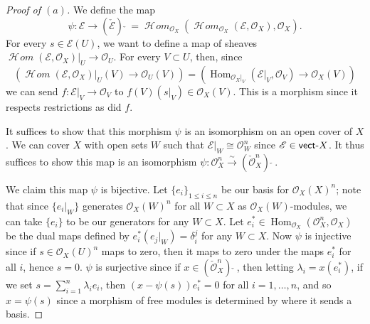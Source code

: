 \documentclass[10pt]{article}
\theoremstyle{definition}
\theoremstyle{remark}
\numberwithin{equation}{section}
\numberwithin{figure}{subsubsection}
\DeclareMathOperator{\Hom}{Hom}
\newcommand{\EE}{\mathscr{E}}
\newcommand{\OO}{\mathcal{O}}
\DeclareMathOperator{\HHom}{\mathscr{H}\!\mathit{om}}
\newcommand{\isoto}{\overset{\sim}{\to}}
\newcommand{\vect}{\mathsf{vect}\mathchar`-}
\begin{document}
\begin{proof}[Proof of $(a)$]
  We define the map
  \begin{equation*}
    \psi\colon\EE \to (\check{\EE})\:\check{}\: = \HHom_{\OO_X}(\HHom_{\OO_X}(\EE,\OO_X),\OO_X).
  \end{equation*}
  For every $s \in \EE(U)$, we want to define a map of sheaves $\HHom(\EE,\OO_X)\vert_U \to \OO_U$. For every $V \subset U$, then, since
  \begin{equation*}
    \left(\HHom(\EE,\OO_X)\vert_U(V) \to \OO_U(V) \right) = \left( \Hom_{\OO_X\vert_V}(\EE\vert_V,\OO_V) \to \OO_X(V) \right)
  \end{equation*}
  we can send $f \colon \EE\vert_V\to\OO_V$ to $f(V)(s\vert_V) \in \OO_X(V)$. This is a morphism since it respects restrictions as did $f$.
  \par It suffices to show that this morphism $\psi$ is an isomorphism on an open cover of $X$. We can cover $X$ with open sets $W$ such that $\EE\vert_W \cong \OO_W^n$ since $\EE \in \vect X$. It thus suffices to show this map is an isomorphism $\psi\colon\OO_X^n \isoto (\check{\OO}_X^n)\:\check{}\:$.
  \par We claim this map $\psi$ is bijective. Let $\{e_i\}_{1 \le i \le n}$ be our basis for $\OO_X(X)^n$; note that since $\{e_i\vert_W\}$ generates $\OO_X(W)^n$ for all $W \subset X$ as $\OO_X(W)$-modules, we can take $\{e_i\}$ to be our generators for any $W \subset X$. Let $e_i^* \in \Hom_{\OO_X}(\OO_X^n,\OO_X)$ be the dual maps defined by $e_i^*(e_j\vert_W) = \delta_i^j$ for any $W \subset X$. Now $\psi$ is injective since if $s \in \OO_X(U)^n$ maps to zero, then it maps to zero under the maps $e_i^*$ for all $i$, hence $s = 0$. $\psi$ is surjective since if $x \in (\check{\OO}_X^n)\:\check{}\:$, then letting $\lambda_i = x(e_i^*)$, if we set $s = \sum_{i=1}^n \lambda_i e_i$, then $(x - \psi(s))e_i^* = 0$ for all $i = 1,\ldots,n$, and so $x = \psi(s)$ since a morphism of free modules is determined by where it sends a basis. 
\end{proof}
\end{document}
